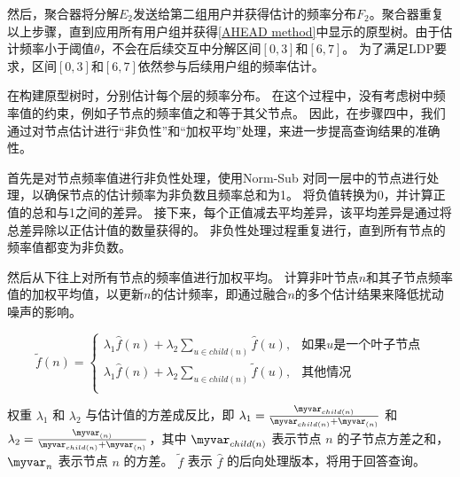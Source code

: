 然后，聚合器将分解$E_{2}$发送给第二组用户并获得估计的频率分布$F_2$。聚合器重复以上步骤，直到应用所有用户组并获得\autoref{AHEAD method}中显示的\myahead 原型树。由于估计频率小于阈值$\theta$，\myahead 不会在后续交互中分解区间$[0,3]$和$[6,7]$。
为了满足LDP要求，区间$[0,3]$和$[6,7]$依然参与后续用户组的频率估计。

在构建原型树时，\myahead 分别估计每个层的频率分布。
在这个过程中，\myahead 没有考虑树中频率值的约束，例如子节点的频率值之和等于其父节点。
因此，在步骤四中，我们通过对节点估计进行“非负性”和“加权平均”处理，来进一步提高\myahead 查询结果的准确性。


首先是对节点频率值进行非负性处理，\myahead 使用Norm-Sub \cite{wang2019consistent}对同一层中的节点进行处理，以确保节点的估计频率为非负数且频率总和为1。
\myahead 将负值转换为0，并计算正值的总和与1之间的差异。
接下来，每个正值减去平均差异，该平均差异是通过将总差异除以正估计值的数量获得的。
非负性处理过程重复进行，直到所有节点的频率值都变为非负数。

然后\myahead 从下往上对所有节点的频率值进行加权平均。
\myahead 计算非叶节点$n$和其子节点频率值的加权平均值，以更新$n$的估计频率，即通过融合$n$的多个估计结果来降低扰动噪声的影响。

\begin{equation}
    \label{weighted average}
    \tilde{f}(n)=\left\{
    \begin{array}{rcl}
    \lambda_1\hat{f}(n) + \lambda_2 \sum_{u \in child(n)}\hat{f}(u), &   \mbox{如果$u$是一个叶子节点} \\
    \lambda_1\hat{f}(n) + \lambda_2 \sum_{u \in child(n)}\tilde{f}(u),    & \mbox{其他情况}  \\
    \end{array}\right.
\end{equation}

权重 $\lambda_1$ 和 $\lambda_2$ 与估计值的方差成反比，即 $\lambda_1 = \frac{\myvar_{child(n)}}{\myvar_{child(n)} + \myvar_{(n)}}$ 和 $\lambda_2 = \frac{\myvar_{(n)}}{\myvar_{child(n)} + \myvar_{(n)}}$，其中 $\myvar_{child(n)}$ 表示节点 $n$ 的子节点方差之和，$\myvar_{n}$ 表示节点 $n$ 的方差。
$\tilde{f}$ 表示 $\hat{f}$ 的后向处理版本，将用于回答查询。

